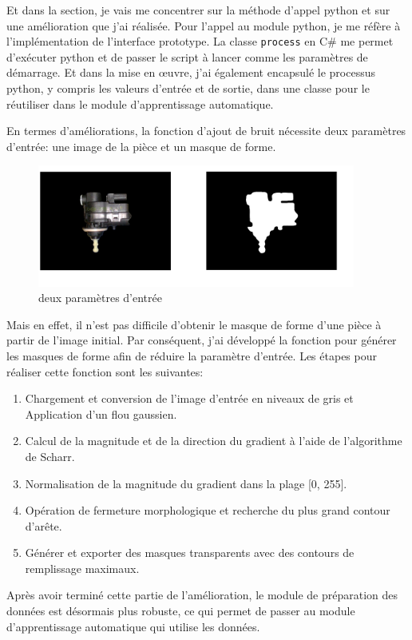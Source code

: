 Et dans la section, je vais me concentrer sur la méthode d'appel python et sur une amélioration que j'ai réalisée. Pour l'appel au module python, je me réfère à l'implémentation de l'interface prototype. La classe \texttt{process} en C\# me permet d'exécuter python et de passer le script à lancer comme les paramètres de démarrage. Et dans la mise en œuvre, j'ai également encapsulé le processus python, y compris les valeurs d'entrée et de sortie, dans une classe pour le réutiliser dans le module d'apprentissage automatique. 

En termes d'améliorations, la fonction d'ajout de bruit nécessite deux paramètres d'entrée: une image de la pièce et un masque de forme. 
\begin{figure}[H]
    \centering
    \includegraphics[height=4cm]{ressources/images/input_perlin.png}
    \caption{deux paramètres d'entrée}
\end{figure}
Mais en effet, il n'est pas difficile d'obtenir le masque de forme d'une pièce à partir de l'image initial. Par conséquent, j'ai développé la fonction pour générer les masques de forme afin de réduire la paramètre d'entrée. Les étapes pour réaliser cette fonction sont les suivantes: 
\begin{enumerate}
    \item Chargement et conversion de l'image d'entrée en niveaux de gris et Application d'un flou gaussien.
    \item Calcul de la magnitude et de la direction du gradient à l'aide de l'algorithme de Scharr.
    \item Normalisation de la magnitude du gradient dans la plage [0, 255].
    \item Opération de fermeture morphologique et recherche du plus grand contour d'arête.
    \item Générer et exporter des masques transparents avec des contours de remplissage maximaux.
\end{enumerate}

Après avoir terminé cette partie de l'amélioration, le module de préparation des données est désormais plus robuste, ce qui permet de passer au module d'apprentissage automatique qui utilise les données.


